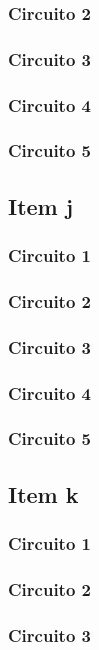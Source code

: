 \documentclass[a4paper, 12pt]{article}
\begin{document}
			\subsubsection{Circuito 2}
			\subsubsection{Circuito 3}
			\subsubsection{Circuito 4}
			\subsubsection{Circuito 5}		
		\subsection{Item j}		
			\subsubsection{Circuito 1}
			\subsubsection{Circuito 2}
			\subsubsection{Circuito 3}
			\subsubsection{Circuito 4}
			\subsubsection{Circuito 5}		
		\subsection{Item k}		
			\subsubsection{Circuito 1}
			\subsubsection{Circuito 2}
			\subsubsection{Circuito 3}
\end{document}
